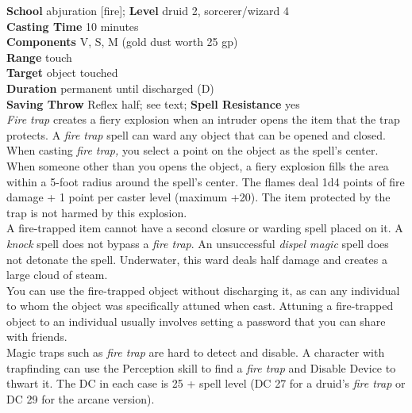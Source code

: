 \textbf{School} abjuration [fire]; \textbf{Level} druid 2, sorcerer/wizard 4\\
\textbf{Casting Time} 10 minutes\\
\textbf{Components} V, S, M (gold dust worth 25 gp)\\
\textbf{Range} touch\\
\textbf{Target} object touched\\
\textbf{Duration} permanent until discharged (D)\\
\textbf{Saving Throw} Reflex half; see text; \textbf{Spell Resistance} yes\\
\textit{Fire trap }creates a fiery explosion when an intruder opens the item that the trap protects. A \textit{fire trap }spell can ward any object that can be opened and closed.\\
When casting \textit{fire trap, }you select a point on the object as the spell's center. When someone other than you opens the object, a fiery explosion fills the area within a 5-foot radius around the spell's center. The flames deal 1d4 points of fire damage + 1 point per caster level (maximum +20). The item protected by the trap is not harmed by this explosion.\\
A fire-trapped item cannot have a second closure or warding spell placed on it. A \textit{knock }spell does not bypass a \textit{fire trap}. An unsuccessful \textit{dispel magic }spell does not detonate the spell. Underwater, this ward deals half damage and creates a large cloud of steam.\\
You can use the fire-trapped object without discharging it, as can any individual to whom the object was specifically attuned when cast. Attuning a fire-trapped object to an individual usually involves setting a password that you can share with friends.\\
Magic traps such as \textit{fire trap }are hard to detect and disable. A character with trapfinding can use the Perception skill to find a \textit{fire trap }and Disable Device to thwart it. The DC in each case is 25 + spell level (DC 27 for a druid's \textit{fire trap }or DC 29 for the arcane version).\\
